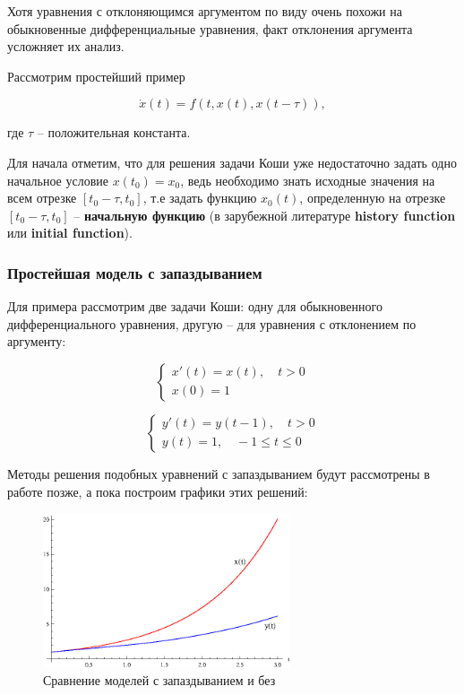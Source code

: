 Хотя уравнения с отклоняющимся аргументом по виду очень похожи на обыкновенные дифференциальные уравнения, факт отклонения аргумента усложняет их анализ.

Рассмотрим простейший пример

\begin{equation}\label{eq:example}
\dot{x}(t) = f(t,x(t),x(t-\tau)),
\end{equation}

где $\tau$ \--- положительная константа.

Для начала отметим, что для решения задачи Коши уже недостаточно задать одно начальное условие $x(t_0)=x_0$, ведь необходимо знать исходные значения на всем отрезке $[t_0-\tau,t_0]$, т.е задать функцию $x_0(t)$, определенную на отрезке $[t_0-\tau,t_0]$ \--- \textbf{начальную функцию} (в зарубежной литературе \textbf{history function} или \textbf{initial function}).

\subsubsection{Простейшая модель с запаздыванием}

Для примера рассмотрим две задачи Коши: одну для обыкновенного дифференциального уравнения, другую \--- для уравнения с отклонением по аргументу:

\begin{equation}\label{eq:no-delay}
\left\{
\begin{aligned}
x'(t) = x(t), \quad t>0\\
x(0) = 1
\end{aligned}
\right.
\end{equation}

\begin{equation}\label{eq:delay}
\left\{
\begin{aligned}
y'(t) = y(t-1), \quad t>0\\
y(t) = 1, \quad -1 \leq t \leq 0
\end{aligned}
\right.
\end{equation}

Методы решения подобных уравнений с запаздыванием будут рассмотрены в работе позже, а пока построим графики этих решений:


\begin{figure}
\begin{center}
\includegraphics[width=0.65\textwidth]{./1_modelling/comparison.eps}
\end{center}
\caption{Сравнение моделей с запаздыванием и без}
\end{figure}

